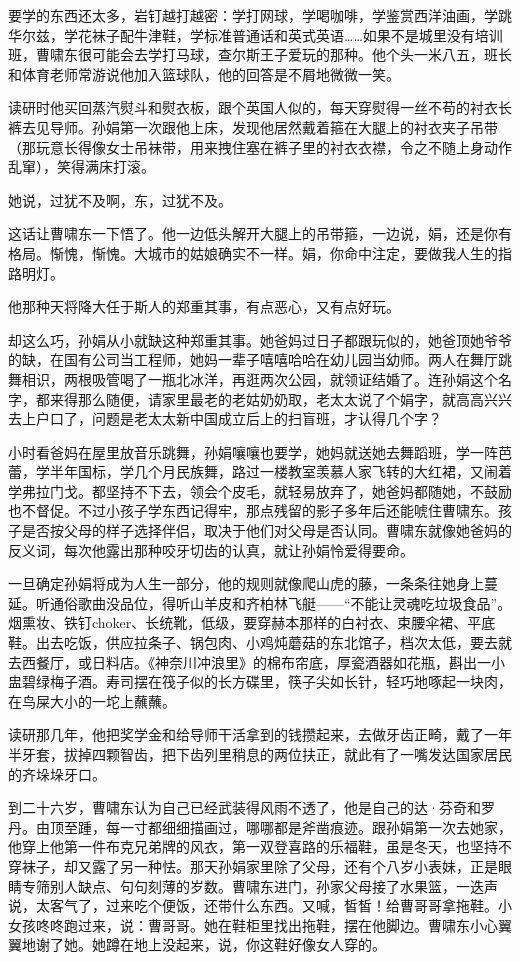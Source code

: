 \documentclass[lang=cn,newtx,12pt,scheme=chinese]{elegantbook}
\begin{document}
要学的东西还太多，岩钉越打越密：学打网球，学喝咖啡，学鉴赏西洋油画，学跳华尔兹，学花袜子配牛津鞋，学标准普通话和英式英语……如果不是城里没有培训班，曹啸东很可能会去学打马球，查尔斯王子爱玩的那种。他个头一米八五，班长和体育老师常游说他加入篮球队，他的回答是不屑地微微一笑。

读研时他买回蒸汽熨斗和熨衣板，跟个英国人似的，每天穿熨得一丝不苟的衬衣长裤去见导师。孙娟第一次跟他上床，发现他居然戴着箍在大腿上的衬衣夹子吊带（那玩意长得像女士吊袜带，用来拽住塞在裤子里的衬衣衣襟，令之不随上身动作乱窜），笑得满床打滚。

她说，过犹不及啊，东，过犹不及。

这话让曹啸东一下悟了。他一边低头解开大腿上的吊带箍，一边说，娟，还是你有格局。惭愧，惭愧。大城市的姑娘确实不一样。娟，你命中注定，要做我人生的指路明灯。

他那种天将降大任于斯人的郑重其事，有点恶心，又有点好玩。

却这么巧，孙娟从小就缺这种郑重其事。她爸妈过日子都跟玩似的，她爸顶她爷爷的缺，在国有公司当工程师，她妈一辈子嘻嘻哈哈在幼儿园当幼师。两人在舞厅跳舞相识，两根吸管喝了一瓶北冰洋，再逛两次公园，就领证结婚了。连孙娟这个名字，都来得那么随便，请家里最老的老姑奶奶取，老太太说了个娟字，就高高兴兴去上户口了，问题是老太太新中国成立后上的扫盲班，才认得几个字？

小时看爸妈在屋里放音乐跳舞，孙娟嚷嚷也要学，她妈就送她去舞蹈班，学一阵芭蕾，学半年国标，学几个月民族舞，路过一楼教室羡慕人家飞转的大红裙，又闹着学弗拉门戈。都坚持不下去，领会个皮毛，就轻易放弃了，她爸妈都随她，不鼓励也不督促。不过小孩子学东西记得牢，那点残留的影子多年后还能唬住曹啸东。孩子是否按父母的样子选择伴侣，取决于他们对父母是否认同。曹啸东就像她爸妈的反义词，每次他露出那种咬牙切齿的认真，就让孙娟怜爱得要命。

一旦确定孙娟将成为人生一部分，他的规则就像爬山虎的藤，一条条往她身上蔓延。听通俗歌曲没品位，得听山羊皮和齐柏林飞艇——“不能让灵魂吃垃圾食品”。烟熏妆、铁钉choker、长统靴，低级，要穿赫本那样的白衬衣、束腰伞裙、平底鞋。出去吃饭，供应拉条子、锅包肉、小鸡炖蘑菇的东北馆子，档次太低，要去就去西餐厅，或日料店。《神奈川冲浪里》的棉布帘底，厚瓷酒器如花瓶，斟出一小盅碧绿梅子酒。寿司摆在筏子似的长方碟里，筷子尖如长针，轻巧地啄起一块肉，在鸟屎大小的一坨上蘸蘸。

读研那几年，他把奖学金和给导师干活拿到的钱攒起来，去做牙齿正畸，戴了一年半牙套，拔掉四颗智齿，把下齿列里稍息的两位扶正，就此有了一嘴发达国家居民的齐垛垛牙口。

到二十六岁，曹啸东认为自己已经武装得风雨不透了，他是自己的达·芬奇和罗丹。由顶至踵，每一寸都细细描画过，哪哪都是斧凿痕迹。跟孙娟第一次去她家，他穿上他第一件布克兄弟牌的风衣，第一双登喜路的乐福鞋，虽是冬天，也坚持不穿袜子，却又露了另一种怯。那天孙娟家里除了父母，还有个八岁小表妹，正是眼睛专筛别人缺点、句句刻薄的岁数。曹啸东进门，孙家父母接了水果篮，一迭声说，太客气了，过来吃个便饭，还带什么东西。又喊，皙皙！给曹哥哥拿拖鞋。小女孩咚咚跑过来，说：曹哥哥。她在鞋柜里找出拖鞋，摆在他脚边。曹啸东小心翼翼地谢了她。她蹲在地上没起来，说，你这鞋好像女人穿的。
\end{document}
